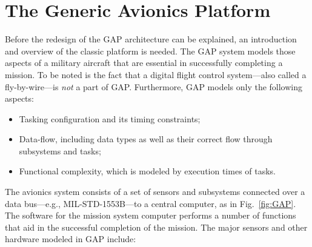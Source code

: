 \section{The Generic Avionics Platform}
\label{GAP}
Before the redesign of the GAP architecture can be explained, an
introduction and overview of the classic platform is needed. The GAP
system models those aspects of a military aircraft that are essential
in successfully completing a mission. To be noted is the fact that a
digital flight control system---also called a fly-by-wire---is
\emph{not} a part of GAP. Furthermore, GAP models only the following
aspects:

\begin{itemize}
\item{Tasking configuration and its timing constraints;}
\item{Data-flow, including data types as well as their correct flow
  through subsystems and tasks;}
\item{Functional complexity, which is modeled by execution times of
  tasks.}
\end{itemize}

The avionics system consists of a set of sensors and subsystems
connected over a data bus---e.g., MIL-STD-1553B---to a central
computer, as in Fig.~\ref{fig:GAP}. The software for the mission
system computer performs a number of functions that aid in the
successful completion of the mission. The major sensors and other
hardware modeled in GAP include:

